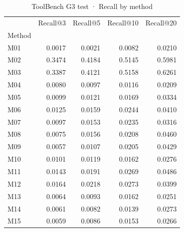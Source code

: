 \begin{table}
\caption{ToolBench G3 test · Recall by method}
\label{tab:ToolBench-G3-test-comparison-comparison-recall}
\begin{tabular}{lrrrr}
\toprule
 & Recall@3 & Recall@5 & Recall@10 & Recall@20 \\
Method &  &  &  &  \\
\midrule
M01 & 0.0017 & 0.0021 & 0.0082 & 0.0210 \\
M02 & 0.3474 & 0.4184 & 0.5145 & 0.5981 \\
M03 & 0.3387 & 0.4121 & 0.5158 & 0.6261 \\
M04 & 0.0080 & 0.0097 & 0.0116 & 0.0209 \\
M05 & 0.0099 & 0.0121 & 0.0169 & 0.0334 \\
M06 & 0.0125 & 0.0159 & 0.0244 & 0.0410 \\
M07 & 0.0097 & 0.0153 & 0.0235 & 0.0316 \\
M08 & 0.0075 & 0.0156 & 0.0208 & 0.0460 \\
M09 & 0.0057 & 0.0107 & 0.0205 & 0.0429 \\
M10 & 0.0101 & 0.0119 & 0.0162 & 0.0276 \\
M11 & 0.0143 & 0.0191 & 0.0269 & 0.0486 \\
M12 & 0.0164 & 0.0218 & 0.0273 & 0.0399 \\
M13 & 0.0064 & 0.0093 & 0.0162 & 0.0251 \\
M14 & 0.0061 & 0.0082 & 0.0139 & 0.0273 \\
M15 & 0.0059 & 0.0086 & 0.0153 & 0.0266 \\
\bottomrule
\end{tabular}
\end{table}
